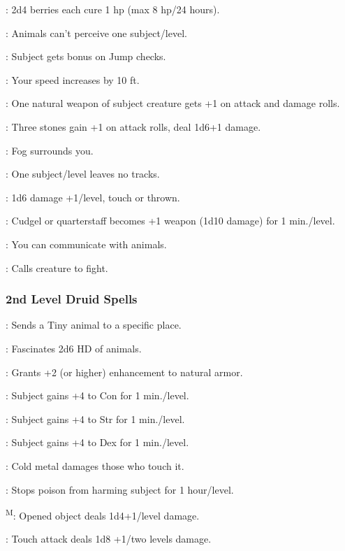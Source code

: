 : 2d4 berries each cure 1 hp (max 8 hp/24 hours).

: Animals can't perceive one subject/level.

: Subject gets bonus on Jump checks.

: Your speed increases by 10 ft.

: One natural weapon of subject creature gets +1 on attack and damage rolls.

: Three stones gain +1 on attack rolls, deal 1d6+1 damage.

: Fog surrounds you.

: One subject/level leaves no tracks.

: 1d6 damage +1/level, touch or thrown.

: Cudgel or quarterstaff becomes +1 weapon (1d10 damage) for 1 min./level.

: You can communicate with animals.

: Calls creature to fight.

\subsubsection{2nd Level Druid Spells}

: Sends a Tiny animal to a specific place.

: Fascinates 2d6 HD of animals.

: Grants +2 (or higher) enhancement to natural armor.

: Subject gains +4 to Con for 1 min./level.

: Subject gains +4 to Str for 1 min./level.

: Subject gains +4 to Dex for 1 min./level.

: Cold metal damages those who touch it.

: Stops poison from harming subject for 1 hour/level.

\textsuperscript{M}: Opened object deals 1d4+1/level damage.

: Touch attack deals 1d8 +1/two levels damage.

